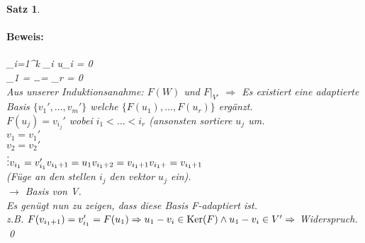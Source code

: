 \documentclass{report}
\newcommand{\lb}{\lambda}
\DeclareMathOperator{\Ker}{Ker}
\theoremstyle{customrem}
\theoremstyle{customdef}
\newtheorem{satz}[definition]{Satz}
\renewenvironment{proof}{\paragraph{Beweis: }}{\qed}
\theoremstyle{customenv}
\begin{document}
\begin{satz}
\begin{proof}
     \sum_{i=1}^k \lb_i u_i = 0\\
    \Rightarrow \lb_1 = \dots = \lb_r = 0
    \)\\
    Aus unserer Induktionsanahme: \(F(W)\) und \(F |_{V'}\) \(\Rightarrow\)
    Es existiert eine adaptierte Basis \(\{v_1', \dots, v_m'\}\) welche
    \(\{F(u_1), \dots, F(u_r)\}\) erg\"anzt.\\
    \(F(u_j) = v_{i_j}'\) wobei \(i_1 < \dots < i_r\) (ansonsten sortiere
    \(u_j\) um.\\
    \(v_1 = v_1'\)\\
    \(v_2 = v_2'\)\\
    \(\vdots\\
    v_{i_1} = v_{i_1}'\\
    v_{i_1+1} = u_1\\
    v_{i_1+2} = v_{i_1 + 1}\\
    v_{i_1+} = v_{i_1 + 1}\\
    \)\\
    (F\"uge an den stellen \(i_j\) den vektor \(u_j\) ein).\\
    \(\rightarrow\) Basis von V.\\
    Es gen\"ugt nun zu zeigen, dass diese Basis F-adaptiert ist.\\
    z.B. \(F(v_{i_1+1}) = v_{i_1}' = F(u_1)\\
    \Rightarrow u_1 - v_i \in \Ker(F) \land u_1 - v_i \in V' \Rightarrow \) Widerspruch. 
  \end{proof}
\end{satz}
\end{document}
